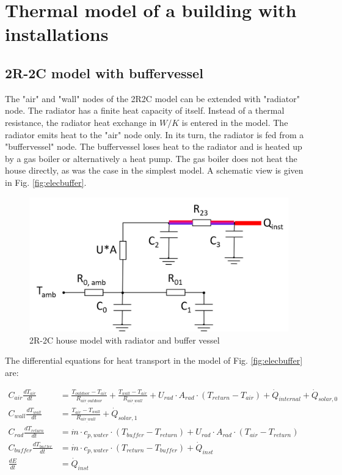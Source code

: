\section{Thermal model of a building with installations}

\subsection{2R-2C model with buffervessel}

The "air" and "wall" nodes of the 2R2C model can be extended with "radiator" node. The radiator has a finite heat capacity of itself. Instead of a thermal resistance, the radiator heat exchange in $W/K$ is entered in the model. The radiator emits heat to the "air" node only. In its turn, the radiator is fed from a "buffervessel" node. The buffervessel loses heat to the radiator and is heated up by a gas boiler or alternatively a heat pump. The gas boiler does not heat the house directly, as was the case in the simplest model. A schematic view is given in Fig. \ref{fig:elecbuffer}.

\begin{figure}[H]
	\centering
	\includegraphics[width=0.7\columnwidth]{Figures/buffervessel.png}
	\caption[Short title]{2R-2C house model with radiator and buffer vessel}
	\label{fig:buffervessel}
\end{figure} 

The differential equations for heat transport in the model of Fig. \ref{fig:elecbuffer} are:

\begin{equation}
	\begin{aligned}
	    C_{air} \frac{dT_{air}}{dt} &= \frac{T_{outdoor}-T_{air}}{R_{air_{\_}outdoor}} + \frac{T_{wall}-T_{air}}{R_{air_{\_}wall}} + U_{rad} \cdot A_{rad} \cdot (T_{return} - T_{air}) + \dot{Q}_{internal} + \dot{Q}_{solar, 0} \\
	    C_{wall} \frac{dT_{wall}}{dt} &= \frac{T_{air}-T_{wall}}{R_{air_{\_}wall}} + \dot{Q}_{solar, 1} \\
	    C_{rad} \frac{dT_{return}}{dt} &= \dot{m} \cdot c_{p, water} \cdot (T_{buffer} - T_{return}) + U_{rad} \cdot A_{rad} \cdot (T_{air} - T_{return}) \\
		C_{buffer} \frac{dT_{buffer}}{dt} &= \dot{m} \cdot c_{p, water} \cdot ( T_{return} - T_{buffer} ) + \dot{Q}_{inst} \\
	    \frac{dE}{dt} &= \dot{Q}_{inst}
	\end{aligned}
\end{equation}

